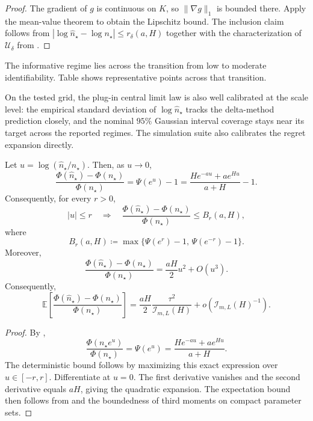 \begin{proof}
The gradient of $g$ is continuous on $K$, so $\|\nabla g\|_1$ is bounded there.
Apply the mean-value theorem to obtain the Lipschitz bound. The inclusion claim
follows from
$|\log \widehat n_\star-\log n_\star|\le r_\delta(a,H)$ together with the
characterization of $\mathcal U_\delta$ from .
\end{proof}

The informative regime lies across the transition from low to moderate
identifiability. Table  shows representative
points across that transition.



On the tested grid, the plug-in central limit law is also well calibrated at the
scale level: the empirical standard deviation of $\log \widehat n_\star$ tracks
the delta-method prediction closely, and the nominal $95\%$ Gaussian interval
coverage stays near its target across the reported regimes. The simulation suite
also calibrates the regret expansion directly.

\begin{proposition}
\label{prop:plugin_horizon_regret}
Let $u = \log(\widehat n_\star/n_\star)$. Then, as $u \to 0$,
\[
  \frac{\Phi(\widehat n_\star)-\Phi(n_\star)}{\Phi(n_\star)}
  = \Psi(e^u)-1
  = \frac{H e^{-au} + a e^{Hu}}{a+H} - 1.
\]
Consequently, for every $r>0$,
\[
  |u|\le r
  \quad\Longrightarrow\quad
  \frac{\Phi(\widehat n_\star)-\Phi(n_\star)}{\Phi(n_\star)}
  \le
  B_r(a,H),
\]
where
\[
  B_r(a,H)
  \coloneqq
  \max\bigl\{\Psi(e^r)-1,\,\Psi(e^{-r})-1\bigr\}.
\]
Moreover,
\[
  \frac{\Phi(\widehat n_\star)-\Phi(n_\star)}{\Phi(n_\star)}
  = \frac{aH}{2}u^2 + O(u^3).
\]
Consequently,
\[
  \mathbb E\!
  \left[
    \frac{\Phi(\widehat n_\star)-\Phi(n_\star)}{\Phi(n_\star)}
  \right]
  = \frac{aH}{2}\frac{\tau^2}{\mathcal I_{m,L}(H)} + o\!\left(\mathcal I_{m,L}(H)^{-1}\right).
\]
\end{proposition}

\begin{proof}
By ,
\[
  \frac{\Phi(n_\star e^u)}{\Phi(n_\star)} = \Psi(e^u)
  = \frac{H e^{-au} + a e^{Hu}}{a+H}.
\]
The deterministic bound follows by maximizing this exact expression over
$u\in[-r,r]$. Differentiate at $u=0$. The first derivative vanishes and the
second derivative equals $aH$, giving the quadratic expansion. The expectation
bound then follows from  and the boundedness of
third moments on compact parameter sets.
\end{proof}

